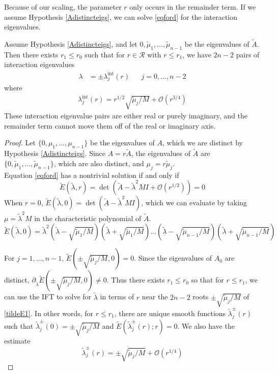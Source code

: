 \documentclass[thesis.tex]{subfiles}
\begin{document}
Because of our scaling, the parameter $r$ only occurs in the remainder term. If we assume Hypothesis \ref{Adistincteigs}, we can solve \eqref{eqford} for the interaction eigenvalues.

\begin{lemma}\label{inteigslemma}
Assume Hypothesis \ref{Adistincteigs}, and let $0, \tilde{\mu}_1, \dots, \tilde{\mu}_{n-1}$ be the eigenvalues of $\tilde{A}$. Then there exists $r_1 \leq r_0$ such that for $r \in \mathcal{R}$ with $r \leq r_1$, we have $2n - 2$ pairs of interaction eigenvalues
\begin{align*}
\lambda &= \pm \lambda^{\text{int}}_j(r) && j = 0, \dots, n-2
\end{align*}
where
\begin{align}\label{inteigsformula}
\lambda^{\text{int}}_j(r) = r^{1/2} \sqrt{\tilde{\mu}_j / M} + \mathcal{O}(r^{3/4})
\end{align}
These interaction eigenvalue pairs are either real or purely imaginary, and the remainder term cannot move them off of the real or imaginary axis.

\begin{proof}
Let $\{0, \mu_1, \dots, \mu_{n-1}\}$ be the eigenvalues of $A$, which we are distinct by Hypothesis \ref{Adistincteigs}. Since $A = r \tilde{A}$, the eigenvalues of $\tilde{A}$ are $\{0, \tilde{\mu}_1, \dots, \tilde{\mu}_{n-1}\}$, which are also distinct, and $\mu_j = r \tilde{\mu}_j$.\\

Equation \eqref{eqford} has a nontrivial solution if and only if
\[
\tilde{E}(\tilde{\lambda}, r) = \det
\left( \tilde{A} - \tilde{\lambda}^2 MI + \mathcal{O}(r^{1/2}) \right) = 0
\]
When $r = 0$, $\tilde{E}(\tilde{\lambda}, 0) = \det(\tilde{A} - \tilde{\lambda}^2 MI)$, which we can evaluate by taking $\mu = \tilde{\lambda}^2 M$ in the characteristic polynomial of $\tilde{A}$.
\begin{equation}\label{tildeE1}
\tilde{E}(\tilde{\lambda}, 0) = \tilde{\lambda}^2
\left( \tilde{\lambda} - \sqrt{\tilde{\mu}_1 / M} \right)
\left( \tilde{\lambda} + \sqrt{\tilde{\mu}_1 / M} \right) \dots
\left( \tilde{\lambda} - \sqrt{\tilde{\mu}_{n-1} / M} \right)
\left( \tilde{\lambda} + \sqrt{\tilde{\mu}_{n-1} / M} \right)
\end{equation}

For $j = 1, \dots, n-1$, $\tilde{E}(\pm \sqrt{\tilde{\mu}_j / M}, 0) = 0$. Since the eigenvalues of $A_0$ are distinct, $\partial_{\tilde{\lambda}} \tilde{E}(\pm \sqrt{\tilde{\mu}_j / M}, 0) \neq 0$. Thus there exists $r_1 \leq r_0$ so that for $r \leq r_1$, we can use the IFT to solve for $\tilde{\lambda}$ in terms of $r$ near the $2n-2$ roots $\pm \sqrt{\tilde{\mu}_j / M}$ of \eqref{tildeE1}. In other words, for $r \leq r_1$, there are unique smooth functions $\tilde{\lambda}_j^\pm(r)$ such that $\tilde{\lambda}_j^\pm(0) = \pm \sqrt{\tilde{\mu}_j / M}$ and $\tilde{E}(\tilde{\lambda}_j^\pm(r); r) = 0$. We also have the estimate
\[
\tilde{\lambda}_j^\pm(r) = \pm \sqrt{\tilde{\mu}_j/ M} + \mathcal{O}(r^{1/4})
\]


\end{proof}
\end{lemma}
\end{document}
